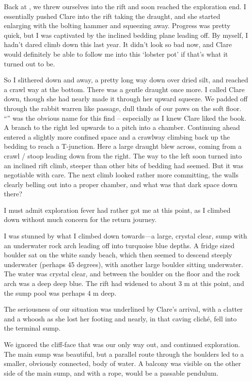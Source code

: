 Back at , we threw ourselves into the rift and soon
reached the exploration end. I essentially pushed Clare into the rift
taking the draught, and she started enlarging with the bolting hammer
and squeezing away. Progress was pretty quick, but I was captivated by
the inclined bedding plane leading off. By myself, I hadn't dared climb
down this last year. It didn't look so bad now, and Clare would
definitely be able to follow me into this `lobster pot' if that's what
it turned out to be.

So I slithered down and away, a pretty long way down over dried silt,
and reached a crawl way at the bottom. There was a gentle draught once
more. I called Clare down, though she had nearly made it through her
upward squeeze. We padded off through the rabbit warren like passage,
dull thuds of our paws on the soft floor. ``'' was
the obvious name for this find -- especially as I knew Clare liked the
book. A branch to the right led upwards to a pitch into a chamber.
Continuing ahead entered a slightly more confined space and a crawlway
climbing back up the bedding to reach a T-junction. Here a large draught
blew across, coming from a crawl / stoop leading down from the right.
The way to the left soon turned into an inclined rift climb, steeper
than other bits of bedding had seemed. But it was negotiable with
care. The next climb looked rather more committing, the walls clearly
belling out into a proper chamber, and what was that dark space down
there?

I must admit exploration fever had rather got me at this point, as I
climbed down without much concern for the return journey. 

I was
stunned by what I climbed down towards---a large, crystal clear, sump
with an underwater rock arch leading off into turquoise blue depths. 
A fridge sized boulder sat on the white sandy beach, which then seemed to descend steeply underwater (perhaps 45 degrees), with another large boulder sitting underwater. 
The water was crystal clear, and between the boulder on the floor and the rock arch was a deep deep blue. 
The rift had widened to about 3 m at this point, and the sump pool was perhaps 4 m deep. 

The
seriousness of our situation was underlined by Clare's arrival, with a clatter and a whoosh as she lost her footing and nearly,
in that caving cliché, fell into the terminal sump.

We ignored the cliff-face that was our only way out, and continued
exploration. The main sump was beautiful, but a parallel route through
the boulders led to a smaller, obviously connected, body of water. A balcony was visible on the other side of the main sump, and with a rope,
would be a passable pendulum. 

